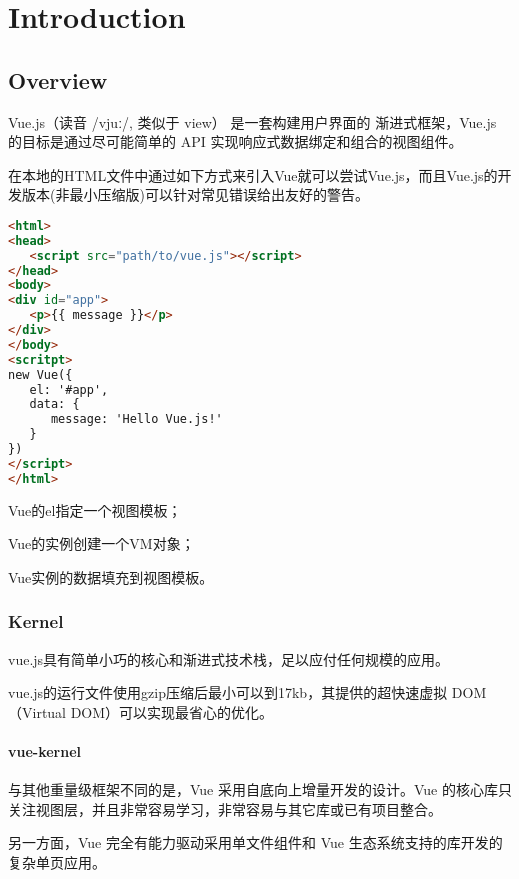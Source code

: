 \part{Introduction}


\chapter{Overview}

Vue.js（读音 /vjuː/, 类似于 view） 是一套构建用户界面的 渐进式框架，Vue.js 的目标是通过尽可能简单的 API 实现响应式数据绑定和组合的视图组件。

在本地的HTML文件中通过如下方式来引入Vue就可以尝试Vue.js，而且Vue.js的开发版本(非最小压缩版)可以针对常见错误给出友好的警告。



\begin{lstlisting}[language=HTML]
<html>
<head>
   <script src="path/to/vue.js"></script>
</head>
<body>
<div id="app">
   <p>{{ message }}</p>
</div>
</body>
<scritpt>
new Vue({
   el: '#app',
   data: {
      message: 'Hello Vue.js!'
   }
})
</script>
</html>
\end{lstlisting}

\begin{compactitem}
\item Vue的el指定一个视图模板；
\item Vue的实例创建一个VM对象；
\item Vue实例的数据填充到视图模板。
\end{compactitem}

\section{Kernel}

vue.js具有简单小巧的核心和渐进式技术栈，足以应付任何规模的应用。

vue.js的运行文件使用gzip压缩后最小可以到17kb，其提供的超快速虚拟 DOM（Virtual DOM）可以实现最省心的优化。



\subsection{vue-kernel}

与其他重量级框架不同的是，Vue 采用自底向上增量开发的设计。Vue 的核心库只关注视图层，并且非常容易学习，非常容易与其它库或已有项目整合。

另一方面，Vue 完全有能力驱动采用单文件组件和 Vue 生态系统支持的库开发的复杂单页应用。

